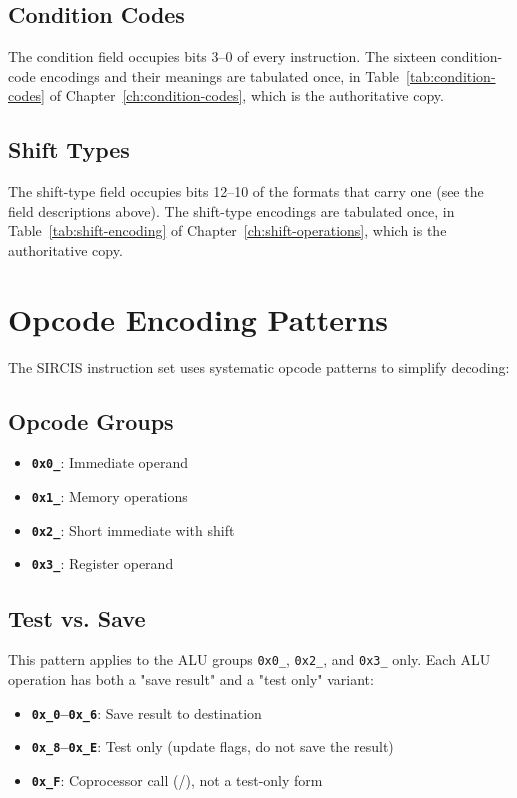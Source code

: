 \subsection{Condition Codes}

The condition field occupies bits 3--0 of every instruction. The sixteen condition-code encodings and their meanings
are tabulated once, in Table~\ref{tab:condition-codes} of Chapter~\ref{ch:condition-codes}, which is the authoritative
copy.

\subsection{Shift Types}

The shift-type field occupies bits 12--10 of the formats that carry one (see the field descriptions above). The
shift-type encodings are tabulated once, in Table~\ref{tab:shift-encoding} of Chapter~\ref{ch:shift-operations}, which
is the authoritative copy.

\section{Opcode Encoding Patterns}

The SIRCIS instruction set uses systematic opcode patterns to simplify decoding:

\subsection{Opcode Groups}

\begin{itemize}
	\item \textbf{\texttt{0x0\_}}: Immediate operand
	\item \textbf{\texttt{0x1\_}}: Memory operations
	\item \textbf{\texttt{0x2\_}}: Short immediate with shift
	\item \textbf{\texttt{0x3\_}}: Register operand
\end{itemize}

\subsection{Test vs. Save}

This pattern applies to the ALU groups \texttt{0x0\_}, \texttt{0x2\_}, and \texttt{0x3\_} only. Each ALU operation has
both a "save result" and a "test only" variant:

\begin{itemize}
	\item \textbf{\texttt{0x\_0}--\texttt{0x\_6}}: Save result to destination
	\item \textbf{\texttt{0x\_8}--\texttt{0x\_E}}: Test only (update flags, do not save the result)
	\item \textbf{\texttt{0x\_F}}: Coprocessor call (/), not a test-only
	      form
\end{itemize}


